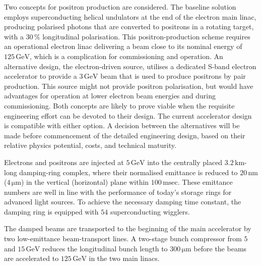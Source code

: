 \documentclass[%
reprint,
 floatfix,
 amsmath,amssymb,
 aps,
]{revtex4-1}
\begin{document}
Two concepts for positron production are considered.
The baseline solution employs superconducting helical undulators at
the end of the electron main linac, producing polarised photons that
are converted to positrons
in a rotating target, with a $30\,\%$
 longitudinal polarisation. 
This positron-production scheme requires an operational electron linac
delivering a beam close to its nominal energy of
$125\,{\mathrm{GeV}}$, 
which is a complication for commissioning and operation. 
An alternative design, the electron-driven source, utilises a dedicated S-band electron accelerator to provide a $3\,{\mathrm{GeV}}$ beam that is used to produce positrons by pair production.
This source might not provide positron polarisation,
but would have advantages for operation at lower electron beam energies and during commissioning.
Both concepts are
likely to prove viable when the requisite engineering effort can be devoted to their design.
The current accelerator design is compatible with either option. 
A decision between the alternatives will be made before commencement of the detailed engineering design, based on their relative physics potential, costs, and technical maturity.

Electrons and positrons are injected at $5\,{\mathrm{GeV}}$ into the
centrally placed $3.2\,{\mathrm{km}}$-long damping-ring complex, where
their normalised emittance is reduced to $20\,{\mathrm{nm}}$
($4\,{\mathrm{\mu m}}$) 
in the vertical (horizontal) plane within $100\,{\mathrm{msec}}$. 
These emittance numbers are well in line with 
the performance of today's storage rings for advanced light sources.
To achieve the necessary damping time constant,
 the damping ring is equipped with $54$ superconducting wigglers. 

The damped beams are transported to the beginning of the main
accelerator by two low-emittance beam-transport lines. A two-stage
bunch compressor from $5$ and $15\,{\mathrm{GeV}}$ reduces the
longitudinal bunch length to $300\,{\mathrm{\mu m}}$ before the beams
are accelerated to $125\,{\mathrm{GeV}}$
 in the two main linacs.
\end{document}
